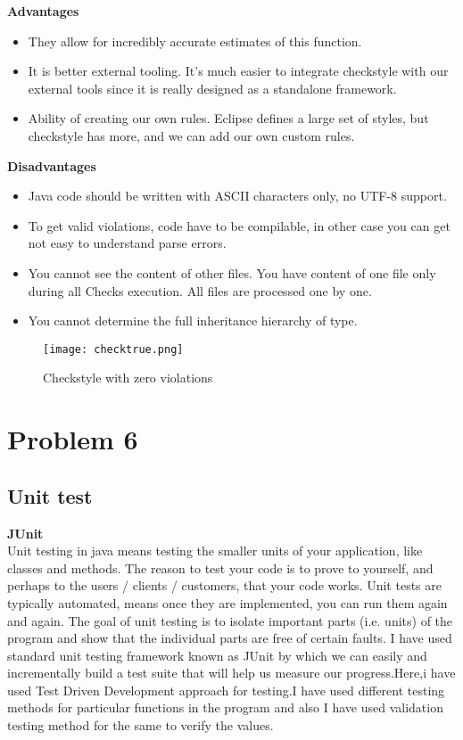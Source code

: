 \documentclass[12pt]{report}
\begin{document}
    \item \textbf{Advantages}
\begin{itemize}
    \item They allow for incredibly accurate estimates of this function.
    \item It is better external tooling. It's much easier to integrate checkstyle with our external tools since it is really designed as a standalone framework.
    \item Ability of creating our own rules. Eclipse defines a large set of styles, but checkstyle has more, and we can add our own custom rules.
\end{itemize}
\item\textbf{Disadvantages}
\begin{itemize}
    \item Java code should be written with ASCII characters only, no UTF-8 support.
    \item To get valid violations, code have to be compilable, in other case you can get not easy to understand parse errors.
    \item You cannot see the content of other files. You have content of one file only during all Checks execution. All files are processed one by one.
    \item You cannot determine the full inheritance hierarchy of type.
\end{itemize}
\begin{figure}[h!]
  \begin{center}
  \texttt{[image: checktrue.png]}
  \end{center}  
    \caption{Checkstyle with zero violations}
\end{figure}
\clearpage
\section{Problem 6}
\subsection{Unit test} 
\item\textbf{JUnit}\\
Unit testing in java means testing the smaller units of your application, like classes and methods. The reason to test your code is to prove to yourself, and perhaps to the users / clients / customers, that your code works.
Unit tests are typically automated, means once they are implemented, you can run them again and again.
The goal of unit testing is to isolate important parts (i.e. units) of the
program and show that the individual parts are free of certain faults. I have
used standard unit testing framework known as JUnit by which we can easily
and incrementally build a test suite that will help us measure our progress.Here,i have used Test Driven Development approach for testing.I have used different testing methods for particular functions in the program and also I have used validation testing method for the same to verify the values. 
\end{document}
